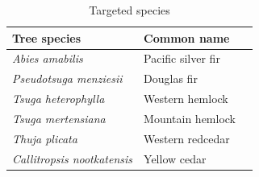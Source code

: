 \documentclass[11pt,letter]{article}
\begin{document}

 
\begin{table}[htb]
	\centering
	\small
	\caption{Targeted species}
\begin{tabular}{|p{5cm}|p{5cm}|p{5cm}|}
\hline
 Tree species & Common name\\ \hline %
\textit{Abies amabilis} & Pacific silver fir \\ \hline
\textit{Pseudotsuga menziesii} & Douglas fir\\ \hline
\textit{Tsuga heterophylla} & Western hemlock\\ \hline
\textit{Tsuga mertensiana} & Mountain hemlock\\ \hline
\textit{Thuja plicata} & Western redcedar\\ \hline
\textit{Callitropsis nootkatensis} & Yellow cedar\\ \hline
\end{tabular}
\label{table:species}
\end{table}
\end{document}
